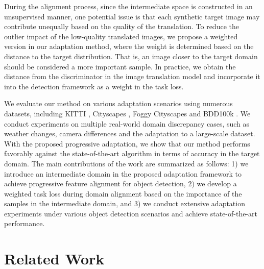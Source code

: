 \documentclass[10pt,twocolumn,letterpaper]{article}
\begin{document}
During the alignment process, since the intermediate space is constructed in an unsupervised manner, one potential issue is that each synthetic target image may contribute unequally based on the quality of the translation.
To reduce the outlier impact of the low-quality translated images, we propose a weighted version in our adaptation method, where the weight is determined based on the distance to the target distribution.
That is, an image closer to the target domain should be considered a more important sample.
In practice, we obtain the distance from the discriminator in the image translation model and incorporate it into the detection framework as a weight in the task loss.


We evaluate our method on various adaptation scenarios using numerous datasets, including KITTI \cite{Geiger2012CVPR}, Cityscapes \cite{Cordts2016Cityscapes}, Foggy Cityscapes \cite{SDV18} and BDD100k \cite{Yu2018BDD100KAD}.
We conduct experiments on multiple real-world domain discrepancy cases, such as weather changes, camera differences and the adaptation to a large-scale dataset.
With the proposed progressive adaptation, we show that our method performs favorably against the state-of-the-art algorithm in terms of accuracy in the target domain.
The main contributions of the work are summarized as follows:
1) we introduce an intermediate domain in the proposed adaptation framework to achieve progressive feature alignment for object detection,
2) we develop a weighted task loss during domain alignment based on the importance of the samples in the intermediate domain, and
3) we conduct extensive adaptation experiments under various object detection scenarios and achieve state-of-the-art performance.

\section{Related Work}
\end{document}
